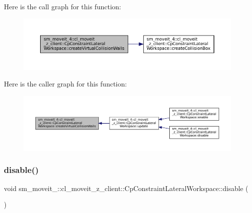 Here is the call graph for this function\+:
\nopagebreak
\begin{figure}[H]
\begin{center}
\leavevmode
\includegraphics[width=350pt]{classsm__moveit__4_1_1cl__moveit__z__client_1_1CpConstraintLateralWorkspace_abb413c4d73a4f6c7f2feca86624b5c7a_cgraph}
\end{center}
\end{figure}
Here is the caller graph for this function\+:
\nopagebreak
\begin{figure}[H]
\begin{center}
\leavevmode
\includegraphics[width=350pt]{classsm__moveit__4_1_1cl__moveit__z__client_1_1CpConstraintLateralWorkspace_abb413c4d73a4f6c7f2feca86624b5c7a_icgraph}
\end{center}
\end{figure}
\mbox{\label{classsm__moveit__4_1_1cl__moveit__z__client_1_1CpConstraintLateralWorkspace_a8d4567487c11e835447cc98d3046a9e2}} 
\subsubsection{\texorpdfstring{disable()}{disable()}}
{\footnotesize\ttfamily void sm\+\_\+moveit\+\_\+::cl\+\_\+moveit\+\_\+z\+\_\+client\+::\+Cp\+Constraint\+Lateral\+Workspace\+::disable (\begin{DoxyParamCaption}{ }\end{DoxyParamCaption})}



